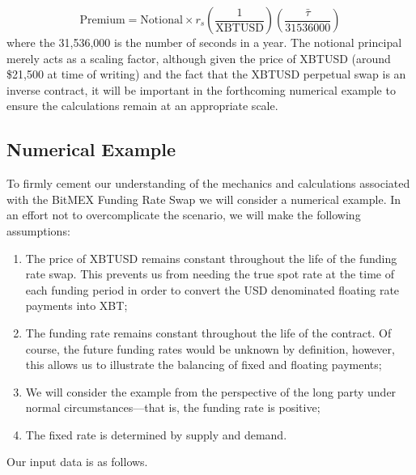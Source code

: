 \begin{equation}
\label{irs_premium}
    \text{Premium} = \text{Notional} \times r_s \left( \frac{1}{\text{XBTUSD}} \right) \left( \frac{\bar{\tau}}{31536000} \right)
\end{equation}
where the 31,536,000 is the number of seconds in a year. The notional principal merely acts as a scaling factor, although given the price of XBTUSD (around \$21,500 at time of writing) and the fact that the XBTUSD perpetual swap is an inverse contract, it will be important in the forthcoming numerical example to ensure the calculations remain at an appropriate scale.

\subsection{Numerical Example}

To firmly cement our understanding of the mechanics and calculations associated with the BitMEX Funding Rate Swap we will consider a numerical example. In an effort not to overcomplicate the scenario, we will make the following assumptions:

\begin{enumerate}
    \item The price of XBTUSD remains constant throughout the life of the funding rate swap. This prevents us from needing the true spot rate at the time of each funding period in order to convert the USD denominated floating rate payments into XBT;
    \newpage
    \item The funding rate remains constant throughout the life of the contract. Of course, the future funding rates would be unknown by definition, however, this allows us to illustrate the balancing of fixed and floating payments;
    \item We will consider the example from the perspective of the long party under normal circumstances––that is, the funding rate is positive;
    \item The fixed rate is determined by supply and demand. 
\end{enumerate}
Our input data is as follows.

